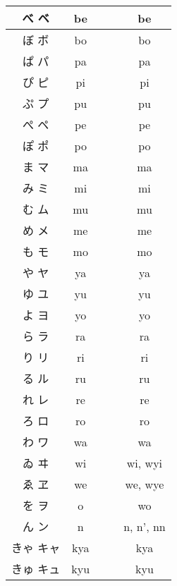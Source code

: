 \documentclass{article}
\begin{document}
\begin{center}
\begin{japanese}
\begin{longtable}{|c|c c c|c|}
                べ ベ & be &&& be \\ \hline
                ぼ ボ & bo &&& bo \\ \hline
                ぱ パ & pa &&& pa \\ \hline
                ぴ ピ & pi &&& pi \\ \hline
                ぷ プ & pu &&& pu \\ \hline
                ぺ ペ & pe &&& pe \\ \hline
                ぽ ポ & po &&& po \\ \hline
                ま マ & ma &&& ma \\ \hline
                み ミ & mi &&& mi \\ \hline
                む ム & mu &&& mu \\ \hline
                め メ & me &&& me \\ \hline
                も モ & mo &&& mo \\ \hline
                や ヤ & ya &&& ya \\ \hline
                ゆ ユ & yu &&& yu \\ \hline
                よ ヨ & yo &&& yo \\ \hline
                ら ラ & ra &&& ra \\ \hline
                り リ & ri &&& ri \\ \hline
                る ル & ru &&& ru \\ \hline
                れ レ & re &&& re \\ \hline
                ろ ロ & ro &&& ro \\ \hline
                わ ワ & wa &&& wa \\ \hline
                ゐ ヰ & wi &&& wi, wyi \\ \hline
                ゑ ヱ & we &&& we, wye \\ \hline
                を ヲ & o &&& wo \\ \hline
                ん ン & n &&& n, n', nn \\ \hline
                きゃ キャ & kya &&& kya \\ \hline
                きゅ キュ & kyu &&& kyu \\ \hline

\end{longtable}
\end{japanese}
\end{center}
\end{document}
